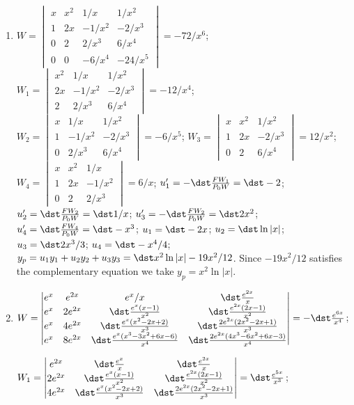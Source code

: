 \documentclass[openany]{book}
\newenvironment{sectionSolutions}{
 \begin{enumerate}[item-label={\thesection.\arabic{enumi}.}]
}{
 \end{enumerate}
}
\begin{document}
\begin{sectionSolutions}
\item
$W=\begin{vmatrix}
x&x^2&1/x&1/x^2\\
1&2x&-1/x^2&-2/x^3\\
0&2&2/x^3&6/x^4\\0&0&-6/x^4&-24/x^5
\end{vmatrix}=-72/x^6$;
$W_1=\begin{vmatrix}
x^2&1/x&1/x^2\\2x&-1/x^2&-2/x^3
\\2&2/x^3&6/x^4\end{vmatrix}=-12/x^4$;
$W_2=\begin{vmatrix}
x&1/x&1/x^2\\1&-1/x^2&-2/x^3\\
0&2/x^3&6/x^4\end{vmatrix}=-6/x^5$;
$W_3=\begin{vmatrix}
x&x^2&1/x^2\\1&2x&-2/x^3\\
0&2&6/x^4\end{vmatrix}=12/x^2$;
$W_4=\begin{vmatrix}
x&x^2&1/x\\1&2x&-1/x^2\\
0&2&2/x^3\end{vmatrix}=6/x$;
$u_1'=-\dst\frac{FW_1}{ P_0W}=\dst-2$;
$u_2'=\dst\frac{FW_2}{ P_0W}=\dst 1/x$;
$u_3'=-\dst\frac{FW_2}{ P_0W}=\dst2x^2$;
$u_4'=\dst\frac{FW_4}{ P_0W}=\dst-x^3$;
$u_1=\dst-2x$;
$u_2=\dst\ln|x|$;
$u_3=\dst2x^3/3$;
$u_4=\dst-x^4/4$;
$y_p=u_1y_1+u_2y_2+u_3y_3=\dst x^2\ln|x|-19x^2/12$.
Since $-19x^2/12$ satisfies the complementary equation we take
$y_p= x^2\ln|x|$.


\item
$W=\begin{vmatrix}
e^x&e^{2x}&e^x/x&\dst\frac{e^{2x}}{ x}\\
e^x&2e^{2x}&\dst\frac{e^x(x-1)}{ x^2}&\dst\frac{e^{2x}(2x-1)}{ x^2}\\
e^x&4e^{2x}&\dst\frac{e^x(x^2-2x+2)}{
x^3}&\dst\frac{2e^{2x}(2x^2-2x+1)}{ x^3}\\
e^x&8e^{2x}&\dst\frac{e^x(x^3-3x^2+6x-6)}{ x^4}
&\dst\frac{2e^{2x}(4x^3-6x^2+6x-3)}{ x^4}
\end{vmatrix}=-\dst\frac{e^{6x}}{ x^4}$;

$W_1=\begin{vmatrix}
e^{2x}&\dst\frac{e^x}{ x}&\dst\frac{e^{2x}}{ x}\\
2e^{2x}&\dst\frac{e^x(x-1)}{ x^2}&\dst\frac{e^{2x}(2x-1)}{ x^2}\\
4e^{2x}&\dst\frac{e^x(x^2-2x+2)}{ x^3}&\dst\frac{2e^{2x}(2x^2-2x+1)}{ x^3}
\end{vmatrix}=\dst\frac{e^{5x}}{ x^3}$;


\end{sectionSolutions}
\end{document}
